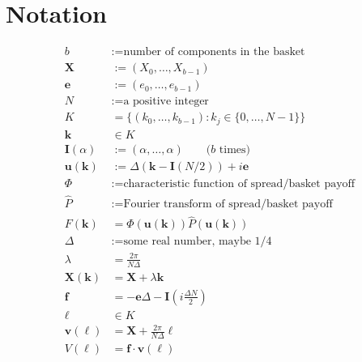 \documentclass[10pt]{amsart}
\newcommand{\vect}[1]{\boldsymbol{#1}}
\begin{document}
\section{Notation}
\begin{align}
 b &:= \text{number of components in the basket} \\
 \vect{X} &:= (X_0,\ldots,X_{b-1}) \\
 \vect{e} &:= (e_0,\ldots,e_{b-1}) \\
 N &:= \text{a positive integer} \\
 K &= \{ (k_0, \ldots, k_{b-1}) : k_j \in \{0, \ldots, N-1 \} \} \\
 \vect{k} &\in K \\
 \vect{I}(\alpha) &:= (\alpha, \ldots, \alpha) \qquad \text{($b$ times)} \\
 \vect{u}(\vect{k}) &:= \Delta (\vect{k} - \vect{I}(N/2)) + i\vect{e} \\
 \Phi &:= \text{characteristic function of spread/basket payoff} \\
 \widehat{P} &:= \text{Fourier transform of spread/basket payoff} \\
 F(\vect{k}) &= \Phi(\vect{u(k)}) \widehat{P}(\vect{u(k)}) \\
 \Delta &:= \text{some real number, maybe 1/4} \\
 \lambda &= \frac{2\pi}{N\Delta} \\
 \vect{X}(\vect{k}) &= \vect{X} + \lambda \vect{k} \\
 \vect{f} &= -\vect{e}\Delta - \vect{I} \left(i \frac{\Delta N}{2} \right) \\
 \vect{\ell} &\in K \\
 \vect{v}(\vect{\ell}) &= \vect{X} + \frac{2 \pi}{N \Delta} \vect{\ell} \\
 V(\vect{\ell}) &= \vect{f} \cdot \vect{v(\ell)}
\end{align}
\end{document}
